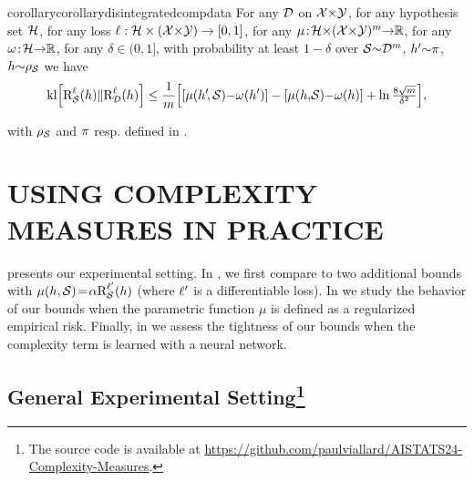\documentclass[twoside]{article}
\theoremstyle{plain}
\newif\ifnotappendix
\begin{document}
\begin{restatable}{corollary}{corollarydisintegratedcompdata}\label{corollary:disintegrated-comp-data}
For any $\Dcal$ on $\Xcal{\times}\Ycal$, for any hypothesis set $\Hcal$, for any loss $\loss : \Hcal\times(\Xcal{\times}\Ycal) \to [0,1]$, for any $\comp\!:\! \Hcal{\times}(\Xcal{\times}\Ycal)^m{\to}\R$, for any $\omega\!:\! \Hcal{\to}\R$, for any $\delta\!\in\!(0,1]$, with probability at least $1{-}\delta$ over $\Scal{\sim}\Dcal^m$, $h'{\sim}\P$, $h{\sim}\AQ$ we have
\allowdisplaybreaks
\ifnotappendix%
\begin{align}
    \kl\!\LB\RiskLoss_{\Scal}(h)\|\RiskLoss_{\Dcal}(h)\RB\le
    &\frac{1}{m}\Big[[\comp(h'\!,\Scal){-}\omega(h')]\nonumber\\
    &-[\comp(h{,}\Scal){-}\omega(h)]+\ln\tfrac{8\sqrt{m}}{\delta^2} \Big],\label{eq:disintegrated-comp-seeger-data}
\end{align}
\else%
\begin{align}
    \kl\!\LB\RiskLoss_{\Scal}(h)\|\RiskLoss_{\Dcal}(h)\RB\le \frac{1}{m}\Big[[\comp(h'\!,\Scal){-}\omega(h')]-[\comp(h{,}\Scal){-}\omega(h)]+\ln\tfrac{8\sqrt{m}}{\delta^2} \Big],
\end{align}
\fi
with  $\AQ$ and $\P$ resp. defined in .
\end{restatable}

\section{USING COMPLEXITY MEASURES IN PRACTICE}
\label{sec:experiments}

 presents our experimental setting.
In , we first compare  to two additional bounds with $\comp(h,\Scal)\!=\!\alpha\RiskLossp_{\Scal}(h)$ (where $\loss'$ is a differentiable loss).
In  we study the behavior of our bounds when the parametric function $\mu$ is defined as a regularized empirical risk.
Finally, in  we assess the tightness of our bounds when the complexity term is learned with a neural network.

\subsection[General Experimental Setting]{General Experimental Setting\protect\footnote{The source code is available at \url{https://github.com/paulviallard/AISTATS24-Complexity-Measures}.}}\label{sec:experiments-setting}
\end{document}
